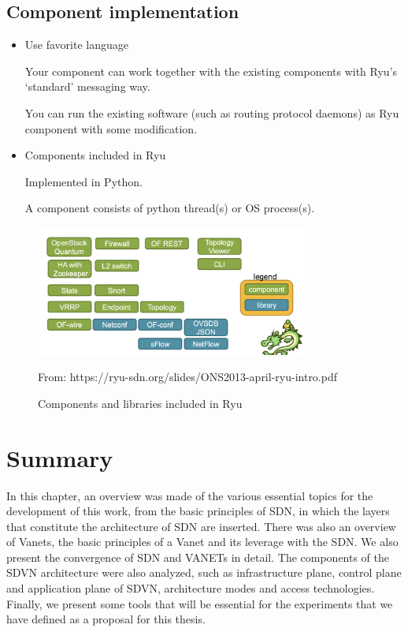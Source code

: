 \documentclass[
  oneside,
  11pt, a4paper,
  footinclude=true,
  headinclude=true,
  cleardoublepage=empty
]{scrbook}
\begin{document}
\subsection{Component implementation}

\begin{itemize}
    \item  Use favorite language \par
    Your component can work together with the existing components with Ryu’s ‘standard’ messaging way.\par
    You can run the existing software (such as routing protocol daemons) as Ryu component with some modification.\par
    \item Components included in Ryu \par
    
    Implemented in Python.\par
    A component consists of python thread(s) or OS process(s).\par
\end{itemize}

\begin{figure}[H]
\begin{center}
  \includegraphics[width=0.8\textwidth]{img/Ryucompo.png}
\end{center}
  \caption{Components and libraries included in Ryu}\par
  From: https://ryu-sdn.org/slides/ONS2013-april-ryu-intro.pdf
  \centering  
\label{Ryu-compo}
\end{figure}


\section{Summary}

In this chapter, an overview was made of the various essential topics for the development of this work, from the basic principles of SDN, in which the layers that constitute the architecture of SDN are inserted. There was also an overview of Vanets, the basic principles of a Vanet and its leverage with the SDN. We also present the convergence of SDN and VANETs in detail. The components of the SDVN architecture were also analyzed, such as infrastructure plane, control plane and application plane of SDVN, architecture modes and access technologies. Finally, we present some tools that will be essential for the experiments that we have defined as a proposal for this thesis.
\end{document}
